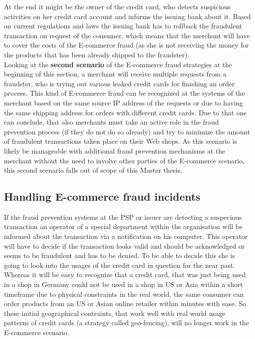 At the end it might be the owner of the credit card, who detects suspicious activities on her credit card account and informs the issuing bank about it. Based on current regulations and laws the issuing bank has to rollback the fraudulent transaction on request of the consumer, which means that the merchant will have to cover the costs of the E-commerce fraud (as she is not receiving the money for the products that has been already shipped to the fraudster). \\

Looking at the \textbf{second scenario} of the E-commerce fraud strategies at the beginning of this section, a merchant will receive multiple requests from a fraudster, who is trying out various leaked credit cards for finishing an order process. This kind of E-commerce fraud can be recognized at the systems of the merchant based on the same source \gls{IP} address of the requests or due to having the same shipping address for orders with different credit cards. Due to that one can conclude, that also merchants must take an active role in the fraud prevention process (if they do not do so already) and try to minimize the amount of fraudulent transactions taken place on their Web shops. As this scenario is likely be manageable with additional fraud prevention mechanisms at the merchant without the need to involve other parties of the E-commerce scenario, this second scenario falls out of scope of this Master thesis.


\subsection{Handling E-commerce fraud incidents}
\label{subsec:e_commerce_fraud_handling}

If the fraud prevention systems at the \gls{PSP} or issuer are detecting a suspecious transaction an operator of a special department within the organisation will be informed about the transaction via a notification on his computer. This operator will have to decide if the transaction looks valid and should be acknowledged or seems to be fraudulent and has to be denied. To be able to decide this she is going to look into the usages of the credit card in question for the near past. Whereas it will be easy to recognize that a credit card, that was just being used in a shop in Germany could not be used in a shop in US or Asia within a short timeframe due to physical constraints in the real world, the same consumer can order products from an US or Asian online retailer within minutes with ease. So these initial geographical contraints, that work well with real world usage patterns of credit cards (a strategy called geo-fencing), will no longer work in the E-commerce scenario. \\

